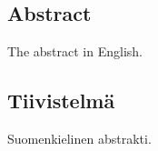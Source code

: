 

\subsection*{Abstract}

The abstract in English.



\clearpage
\subsection*{Tiivistelm\"a}
Suomenkielinen abstrakti.


\clearpage
